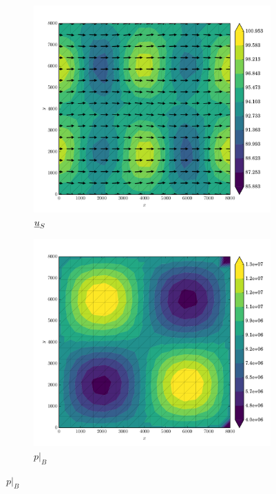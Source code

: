 \begin{figure}
  
  \centering 
  
  \begin{subfigure}[b]{0.3\linewidth}
    \includegraphics[width=\linewidth]{images/stress_balance/RS/U_mag.pdf}
  \caption{$\underline{u}_S$}
  \label{rs_ms_U}
  \end{subfigure}
  \begin{subfigure}[b]{0.3\linewidth}
    \includegraphics[width=\linewidth]{images/stress_balance/RS/p.pdf}
  \caption{$p |_B$}
  \label{rs_ms_p}
  \end{subfigure}


\end{figure}
